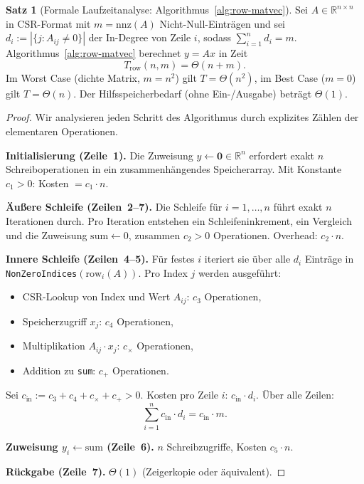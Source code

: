 \documentclass[a4paper,12pt]{report}
\theoremstyle{definition}
\newtheorem{satz}{Satz}
\begin{document}
	\begin{satz}[Formale Laufzeitanalyse: Algorithmus~\ref{alg:row-matvec}]
		\label{satz:laufzeit-row-matvec}
		Sei $A \in \mathbb{R}^{n \times n}$ in CSR-Format mit $m = \mathrm{nnz}(A)$ Nicht-Null-Einträgen und sei $d_i := |\{j : A_{ij} \neq 0\}|$ der In-Degree von Zeile $i$, sodass $\sum_{i=1}^n d_i = m$. Algorithmus~\ref{alg:row-matvec} berechnet $y = Ax$ in Zeit
		\[
			T_{\mathrm{row}}(n,m) = \Theta(n + m).
		\]
		Im Worst Case (dichte Matrix, $m = n^2$) gilt $T = \Theta(n^2)$, im Best Case ($m = 0$) gilt $T = \Theta(n)$. Der Hilfsspeicherbedarf (ohne Ein-/Ausgabe) beträgt $\Theta(1)$.
	\end{satz}
	\begin{proof}
		Wir analysieren jeden Schritt des Algorithmus durch explizites Zählen der elementaren Operationen.

		\textbf{Initialisierung (Zeile~1).} Die Zuweisung $y \gets \mathbf{0} \in \mathbb{R}^n$ erfordert exakt $n$ Schreiboperationen in ein zusammenhängendes Speicherarray. Mit Konstante $c_1 > 0$: Kosten $= c_1 \cdot n$.

		\textbf{Äußere Schleife (Zeilen~2--7).} Die Schleife für $i = 1, \ldots, n$ führt exakt $n$ Iterationen durch. Pro Iteration entstehen ein Schleifeninkrement, ein Vergleich und die Zuweisung $\mathrm{sum} \gets 0$, zusammen $c_2 > 0$ Operationen. Overhead: $c_2 \cdot n$.

		\textbf{Innere Schleife (Zeilen~4--5).} Für festes $i$ iteriert sie über alle $d_i$ Einträge in \texttt{NonZeroIndices}$(\mathrm{row}_i(A))$. Pro Index $j$ werden ausgeführt:
		\begin{itemize}
			\item CSR-Lookup von Index und Wert $A_{ij}$: $c_3$ Operationen,
			\item Speicherzugriff $x_j$: $c_4$ Operationen,
			\item Multiplikation $A_{ij} \cdot x_j$: $c_\times$ Operationen,
			\item Addition zu \texttt{sum}: $c_+$ Operationen.
		\end{itemize}
		Sei $c_{\mathrm{in}} := c_3 + c_4 + c_\times + c_+ > 0$. Kosten pro Zeile $i$: $c_{\mathrm{in}} \cdot d_i$. Über alle Zeilen:
		\[
			\sum_{i=1}^{n} c_{\mathrm{in}} \cdot d_i = c_{\mathrm{in}} \cdot m.
		\]

		\textbf{Zuweisung $y_i \gets \mathrm{sum}$ (Zeile~6).} $n$ Schreibzugriffe, Kosten $c_5 \cdot n$.

		\textbf{Rückgabe (Zeile~7).} $\Theta(1)$ (Zeigerkopie oder äquivalent).


\end{proof}
\end{document}
